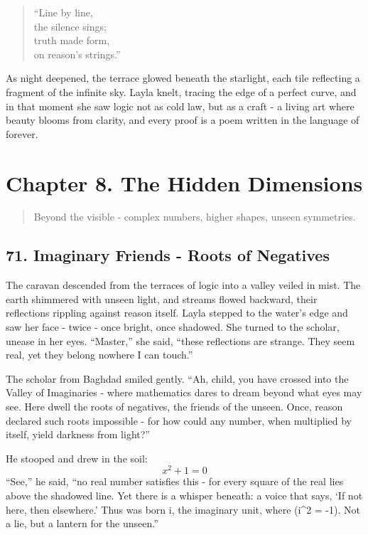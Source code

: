 \documentclass[
  letterpaper,
  DIV=11,
  numbers=noendperiod]{scrreprt}
\begin{document}
\begin{quote}
``Line by line,\\
the silence sings;\\
truth made form,\\
on reason's strings.''
\end{quote}

As night deepened, the terrace glowed beneath the starlight, each tile
reflecting a fragment of the infinite sky. Layla knelt, tracing the edge
of a perfect curve, and in that moment she saw logic not as cold law,
but as a craft - a living art where beauty blooms from clarity, and
every proof is a poem written in the language of forever.

\section{Chapter 8. The Hidden
Dimensions}\label{chapter-8.-the-hidden-dimensions}

\begin{quote}
Beyond the visible - complex numbers, higher shapes, unseen symmetries.
\end{quote}

\subsection{71. Imaginary Friends - Roots of
Negatives}\label{imaginary-friends---roots-of-negatives}

The caravan descended from the terraces of logic into a valley veiled in
mist. The earth shimmered with unseen light, and streams flowed
backward, their reflections rippling against reason itself. Layla
stepped to the water's edge and saw her face - twice - once bright, once
shadowed. She turned to the scholar, unease in her eyes. ``Master,'' she
said, ``these reflections are strange. They seem real, yet they belong
nowhere I can touch.''

The scholar from Baghdad smiled gently. ``Ah, child, you have crossed
into the Valley of Imaginaries - where mathematics dares to dream beyond
what eyes may see. Here dwell the roots of negatives, the friends of the
unseen. Once, reason declared such roots impossible - for how could any
number, when multiplied by itself, yield darkness from light?''

He stooped and drew in the soil: \[
x^2 + 1 = 0
\] ``See,'' he said, ``no real number satisfies this - for every square
of the real lies above the shadowed line. Yet there is a whisper
beneath: a voice that says, `If not here, then elsewhere.' Thus was born
i, the imaginary unit, where (i\^{}2 = -1). Not a lie, but a lantern for
the unseen.''
\end{document}
